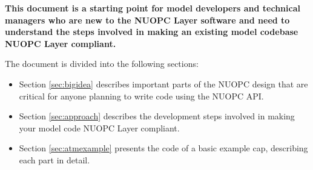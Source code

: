 \textbf{This document is a starting point for model developers
and technical managers who are new to the NUOPC Layer software
and need to understand the steps involved in making an existing
model codebase NUOPC Layer compliant.}

The document is divided into the following sections:
\begin{itemize}

\item Section \ref{sec:bigidea} describes important parts of the NUOPC design that
are critical for anyone planning to write code using the NUOPC API.

\item Section \ref{sec:approach} describes the development steps involved
in making your model code NUOPC Layer compliant.

\item Section \ref{sec:atmexample} presents the code of a basic example cap, describing 
each part in detail.

\end{itemize}


